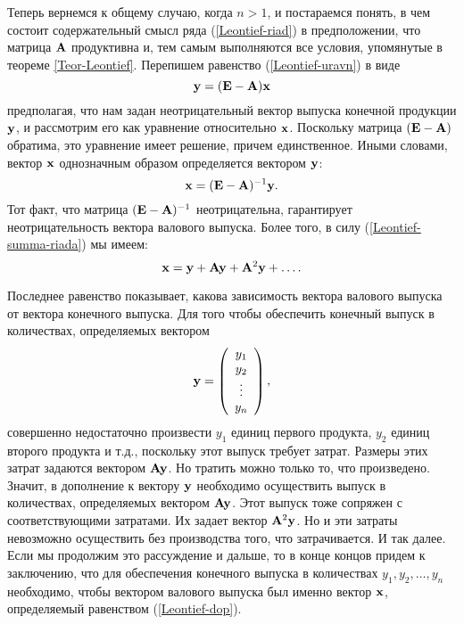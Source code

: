     Теперь вернемся к общему случаю, когда $n>1$, и постараемся
    понять, в чем состоит содержательный смысл ряда (\ref{Leontief-riad})
    в предположении, что матрица $\mathbf{A}$ продуктивна и, тем самым
    выполняются все условия, упомянутые в теореме \ref{Teor-Leontief}.
    Перепишем равенство (\ref{Leontief-uravn}) в виде
    \[\mathbf{y}=(\mathbf{E}-\mathbf{A})\mathbf{x}\]
    предполагая, что нам задан неотрицательный вектор выпуска конечной
    продукции $\mathbf{y}$, и рассмотрим его как уравнение относительно
    $\mathbf{x}$. Поскольку матрица $(\mathbf{E}-\mathbf{A})$ обратима, это
    уравнение имеет решение, причем единственное. Иными словами,
    вектор $\mathbf{x}$ однозначным образом определяется вектором
    $\mathbf{y}$:
    \[\mathbf{x}=(\mathbf{E}-\mathbf{A})^{-1}\mathbf{y}.\]
    Тот факт, что матрица $(\mathbf{E}-\mathbf{A})^{-1}$ неотрицательна,
    гарантирует неотрицательность вектора валового выпуска. Более
    того, в силу (\ref{Leontief-summa-riada}) мы имеем:
    \begin{equation} \label{Leontief-dop}
    \mathbf{x}=\mathbf{y}+\mathbf{A}\mathbf{y}+\mathbf{A}^{2}\mathbf{y}+\ldots.
\end{equation}



    Последнее равенство показывает, какова зависимость вектора валового
    выпуска от вектора конечного выпуска.
    Для того чтобы обеспечить конечный
    выпуск в количествах, определяемых вектором
    \[\mathbf{y}=\left(
     \begin{array}{c}
        y_{1} \\
        y_{2} \\
        \vdots \\
        y_{n}\\
      \end{array}\right),\]
    совершенно недостаточно произвести $y_{1}$ единиц первого
    продукта, $y_{2}$ единиц второго продукта и т.д., поскольку этот
    выпуск требует затрат. Размеры этих затрат
    задаются вектором $\mathbf{A}\mathbf{y}$. Но тратить можно только то,
    что произведено. Значит, в дополнение к вектору $\mathbf{y}$
    необходимо осуществить выпуск в количествах, определяемых
    вектором  $\mathbf{A}\mathbf{y}$. Этот выпуск тоже сопряжен с
    соответствующими затратами. Их задает вектор $\mathbf{A}^{2}\mathbf{y}$.
    Но и эти затраты невозможно осуществить без производства того, что
    затрачивается. И так далее. Если мы продолжим это рассуждение и дальше,
    то в конце концов придем к заключению, что для обеспечения конечного выпуска в
    количествах $y_{1},y_{2},\ldots, y_{n}$  необходимо, чтобы вектором валового
    выпуска был именно вектор $\mathbf{x}$, определяемый равенством (\ref{Leontief-dop}).

